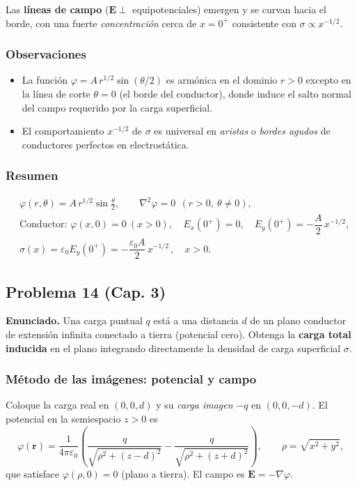 \documentclass{article}
\begin{document}
Las \textbf{líneas de campo} ($\mathbf E\perp$ equipotenciales) emergen y se curvan hacia el borde, con una fuerte \emph{concentración} cerca de $x=0^+$ consistente con $\sigma\propto x^{-1/2}$.

\subsubsection*{Observaciones}
\begin{itemize}
\item La función $\varphi=A\,r^{1/2}\sin(\theta/2)$ es armónica en el dominio $r>0$ excepto en la línea de corte $\theta=0$ (el borde del conductor), donde induce el salto normal del campo requerido por la carga superficial.
\item El comportamiento $x^{-1/2}$ de $\sigma$ es universal en \emph{aristas} o \emph{bordes agudos} de conductores perfectos en electrostática.
\end{itemize}

\subsubsection*{Resumen}
\[
\boxed{
\begin{aligned}
&\varphi(r,\theta)=A\,r^{1/2}\sin\!\frac{\theta}{2},\qquad \nabla^2\varphi=0\ \ (r>0,\ \theta\neq 0),\\[4pt]
&\text{Conductor: } \varphi(x,0)=0 \ (x>0),\quad E_x(0^+)=0,\quad 
E_y(0^+)=-\dfrac{A}{2}\,x^{-1/2},\\[4pt]
&\sigma(x)=\varepsilon_0 E_y(0^+)=-\dfrac{\varepsilon_0 A}{2}\,x^{-1/2}\,,\quad x>0.
\end{aligned}}
\]


\subsection{Problema 14 (Cap. 3)} \vspace{0.5cm}

\textbf{Enunciado.} Una carga puntual $q$ está a una distancia $d$ de un plano conductor de extensión infinita conectado a tierra (potencial cero). Obtenga la \textbf{carga total inducida} en el plano integrando directamente la densidad de carga superficial $\sigma$.

\subsubsection*{Método de las imágenes: potencial y campo}
Coloque la carga real en $(0,0,d)$ y su \emph{carga imagen} $-q$ en $(0,0,-d)$. El potencial en la semiespacio $z>0$ es
\[
\varphi(\mathbf r)=\frac{1}{4\pi\varepsilon_0}\left(
\frac{q}{\sqrt{\rho^2+(z-d)^2}}-\frac{q}{\sqrt{\rho^2+(z+d)^2}}
\right),\qquad \rho=\sqrt{x^2+y^2},
\]
que satisface $\varphi(\rho,0)=0$ (plano a tierra). El campo es $\mathbf E=-\nabla\varphi$.
\end{document}
